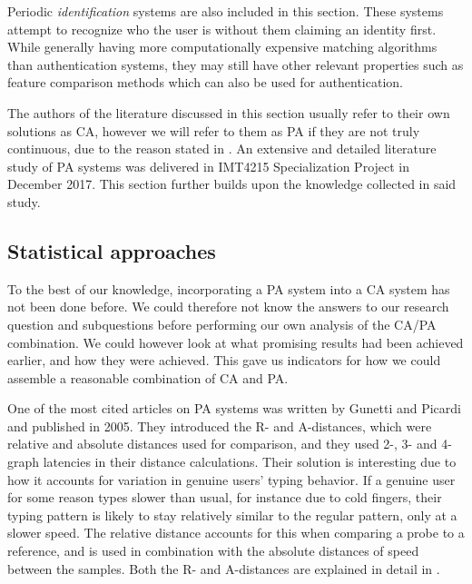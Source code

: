 Periodic \textit{identification} systems are also included in this section.
These systems attempt to recognize who the user is without them claiming an identity first.
While generally having more computationally expensive matching algorithms than authentication systems, they may still have other relevant properties such as feature comparison methods which can also be used for authentication.

The authors of the literature discussed in this section usually refer to their own solutions as CA, however we will refer to them as PA if they are not truly continuous, due to the reason stated in .
An extensive and detailed literature study of PA systems \cite{nilsenSpec} was delivered in IMT4215 Specialization Project in December 2017.
This section further builds upon the knowledge collected in said study.

\subsection{Statistical approaches}
\label{sec:related-statistical-approaches}
To the best of our knowledge, incorporating a PA system into a CA system has not been done before. 
We could therefore not know the answers to our research question and subquestions before performing our own analysis of the CA/PA combination.
We could however look at what promising results had been achieved earlier, and how they were achieved.
This gave us indicators for how we could assemble a reasonable combination of CA and PA.

One of the most cited articles on PA systems was written by Gunetti and Picardi \cite{gnp} and published in 2005.
They introduced the R- and A-distances, which were relative and absolute distances used for comparison, and they used 2-, 3- and 4-graph latencies in their distance calculations.
Their solution is interesting due to how it accounts for variation in genuine users' typing behavior.
If a genuine user for some reason types slower than usual, for instance due to cold fingers, their typing pattern is likely to stay relatively similar to the regular pattern, only at a slower speed.
The relative distance accounts for this when comparing a probe to a reference, and is used in combination with the absolute distances of speed between the samples.
Both the R- and A-distances are explained in detail in .

